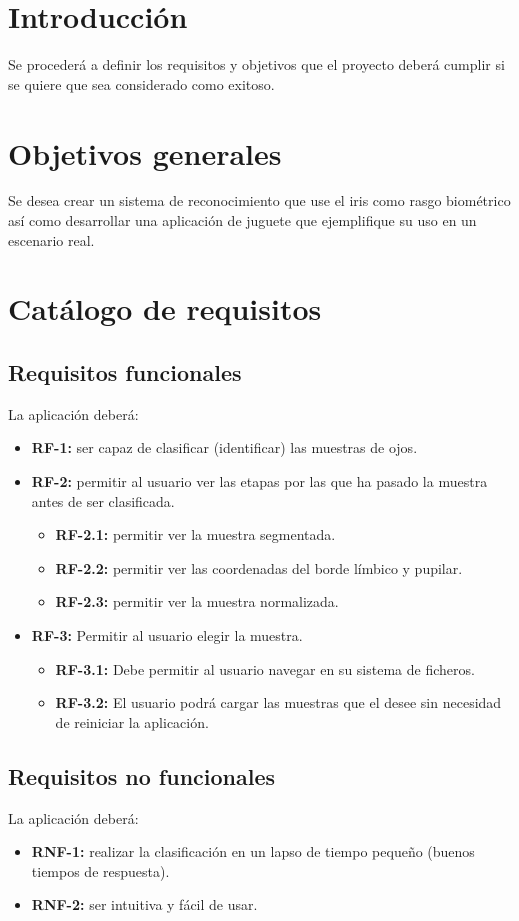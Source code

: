 
\section{Introducción}
Se procederá a definir los requisitos y objetivos que el proyecto deberá cumplir si se quiere que sea considerado como exitoso.
\section{Objetivos generales}
Se desea crear un sistema de reconocimiento que use el iris como rasgo biométrico así como desarrollar una aplicación de juguete que ejemplifique su uso en un escenario real.
\section{Catálogo de requisitos}
\subsection{Requisitos funcionales}
La aplicación deberá:
\begin{itemize}
    \item \textbf{RF-1:} ser capaz de clasificar (identificar) las muestras de ojos.
    \item \textbf{RF-2:} permitir al usuario ver las etapas por las que ha pasado la muestra antes de ser clasificada.
        \begin{itemize}
        \item \textbf{RF-2.1:} permitir ver la muestra segmentada.
        \item \textbf{RF-2.2:} permitir ver las coordenadas del borde límbico y pupilar.
        \item \textbf{RF-2.3:} permitir ver la muestra normalizada.
    \end{itemize}

    \item \textbf{RF-3:} Permitir al usuario elegir la muestra.
    \begin{itemize}
        \item \textbf{RF-3.1:} Debe permitir al usuario navegar en su sistema de ficheros.
        \item \textbf{RF-3.2:} El usuario podrá cargar las muestras que el desee sin necesidad de reiniciar la aplicación.
    \end{itemize}
\end{itemize}
\subsection{Requisitos no funcionales}
La aplicación deberá:
\begin{itemize}
    \item \textbf{RNF-1:} realizar la clasificación en un lapso de tiempo pequeño (buenos tiempos de respuesta).
    \item \textbf{RNF-2:} ser intuitiva y fácil de usar.
\end{itemize}
